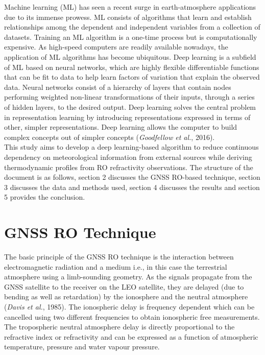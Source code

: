 \documentclass[a4paper,12pt,twoside]{article}
\begin{document}
\noindent Machine learning (ML) has seen a recent surge in earth-atmosphere applications due to its immense prowess. ML consists of algorithms that learn and establish relationships among the dependent and independent variables from a collection of datasets. Training an ML algorithm is a one-time process but is computationally expensive. As high-speed computers are readily available nowadays, the application of ML algorithms has become ubiquitous. Deep learning is a subfield of ML based on neural networks, which are highly flexible differentiable functions that can be fit to data to help learn factors of variation that explain the observed data. Neural networks consist of a hierarchy of layers that contain nodes performing weighted non-linear transformations of their inputs, through a series of hidden layers, to the desired output. Deep learning solves the central problem in representation learning by introducing representations expressed in terms of other, simpler representations. Deep learning allows the computer to build complex concepts out of simpler concepts (\textit{Goodfellow et al.}, 2016).\\ 

\noindent  This study aims to develop a deep learning-based algorithm to reduce continuous dependency on meteorological information from external sources while deriving thermodynamic profiles from RO refractivity observations. The structure of the document is as follows, section 2 discusses the GNSS RO-based  technique, section 3 discusses the data and methods used, section 4 discusses the results and section 5 provides the conclusion.\\

\section{GNSS RO Technique}

\noindent The basic principle of the GNSS RO technique is the interaction between electromagnetic radiation and a medium i.e., in this case the terrestrial atmosphere using a limb-sounding geometry. As the signals propagate from the GNSS satellite to the receiver on the LEO satellite, they are delayed (due to bending as well as retardation) by the ionosphere and the neutral atmosphere (\textit{Davis et al.}, 1985). The ionospheric delay is frequency dependent which can be cancelled using two different frequencies to obtain ionospheric free measurements. The tropospheric neutral atmosphere delay is directly proportional to the refractive index or refractivity and can be expressed as a function of atmospheric temperature, pressure and water vapour pressure. \\
\end{document}
